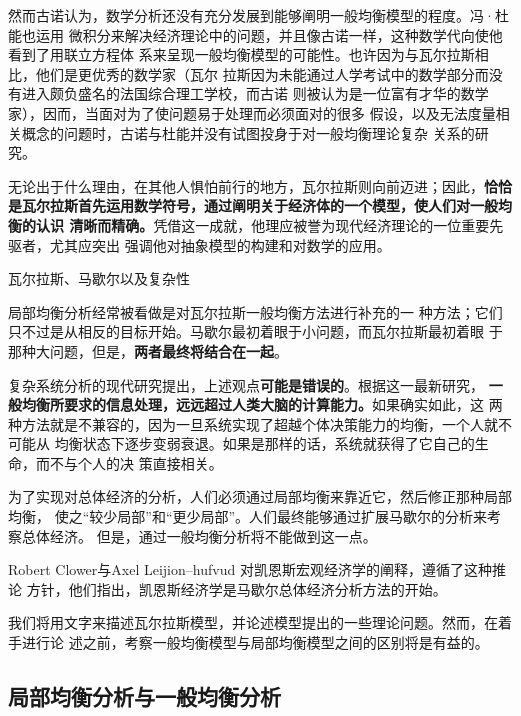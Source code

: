 然而古诺认为，数学分析还没有充分发展到能够阐明一般均衡模型的程度。冯·杜能也运用
微积分来解决经济理论中的问题，并且像古诺一样，这种数学代向使他看到了用联立方程体
系来呈现一般均衡模型的可能性。也许因为与瓦尔拉斯相比，他们是更优秀的数学家（瓦尔
拉斯因为未能通过人学考试中的数学部分而没有进入颇负盛名的法国综合理工学校，而古诺
则被认为是一位富有才华的数学家），因而，当面对为了使问题易于处理而必须面对的很多
假设，以及无法度量相关概念的问题时，古诺与杜能并没有试图投身于对一般均衡理论复杂
关系的研究。

无论出于什么理由，在其他人惧怕前行的地方，瓦尔拉斯则向前迈进；因此，\textbf{恰恰
是瓦尔拉斯首先运用数学符号，通过阐明关于经济体的一个模型，使人们对一般均衡的认识
清晰而精确。}凭借这一成就，他理应被誉为现代经济理论的一位重要先驱者，尤其应突出
强调他对抽象模型的构建和对数学的应用。

\begin{mybox}{瓦尔拉斯、马歇尔以及复杂性}
  \begin{multicols}{2}局部均衡分析经常被看做是对瓦尔拉斯一般均衡方法进行补充的一
种方法；它们只不过是从相反的目标开始。马歇尔最初着眼于小问题，而瓦尔拉斯最初着眼
于那种大问题，但是，\textbf{两者最终将结合在一起}。

    复杂系统分析的现代研究提出，上述观点\textbf{可能是错误的}。根据这一最新研究，
\textbf{一般均衡所要求的信息处理，远远超过人类大脑的计算能力。}如果确实如此，这
两种方法就是不兼容的，因为一旦系统实现了超越个体决策能力的均衡，一个人就不可能从
均衡状态下逐步变弱衰退。如果是那样的话，系统就获得了它自己的生命，而不与个人的决
策直接相关。

    为了实现对总体经济的分析，人们必须通过局部均衡来靠近它，然后修正那种局部均衡，
使之“较少局部”和“更少局部”。人们最终能够通过扩展马歇尔的分析来考察总体经济。
但是，通过一般均衡分析将不能做到这一点。

    Robert Clower与Axel Leijion--hufvud 对凯恩斯宏观经济学的阐释，遵循了这种推论
方针，他们指出，凯恩斯经济学是马歇尔总体经济分析方法的开始。
  \end{multicols} %
\end{mybox}

我们将用文字来描述瓦尔拉斯模型，并论述模型提出的一些理论问题。然而，在着手进行论
述之前，考察一般均衡模型与局部均衡模型之间的区别将是有益的。


\subsection{局部均衡分析与一般均衡分析}

